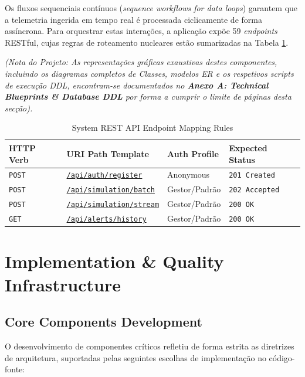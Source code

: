 \documentclass[11pt,a4paper]{article}
\begin{document}
Os fluxos sequenciais contínuos (\textit{sequence workflows for data loops}) garantem que a telemetria ingerida em tempo real é processada ciclicamente de forma assíncrona. Para orquestrar estas interações, a aplicação expõe 59 \textit{endpoints} RESTful, cujas regras de roteamento nucleares estão sumarizadas na Tabela \ref{tab:api_design}. 

\vspace{0.2cm}
\noindent\textit{(Nota do Projeto: As representações gráficas exaustivas destes componentes, incluindo os diagramas completos de Classes, modelos ER e os respetivos scripts de execução DDL, encontram-se documentados no \textbf{Anexo A: Technical Blueprints \& Database DDL} por forma a cumprir o limite de páginas desta secção).}

\begin{table}[H]
\centering
\caption{System REST API Endpoint Mapping Rules}
\label{tab:api_design}
\renewcommand{\arraystretch}{1.2}
\begin{tabular}{llll}
\rowcolor{primaryblue} \textbf{\color{white}HTTP Verb} & \textbf{\color{white}URI Path Template} & \textbf{\color{white}Auth Profile} & \textbf{\color{white}Expected Status} \\
\midrule
\texttt{POST} & \href{http://localhost:8080/api/auth/register}{\texttt{/api/auth/register}} & Anonymous & \texttt{201 Created} \\
\rowcolor{softgray} \texttt{POST} & \href{http://localhost:8080/api/simulation/batch}{\texttt{/api/simulation/batch}} & Gestor/Padrão & \texttt{202 Accepted} \\
\texttt{POST} & \href{http://localhost:8080/api/simulation/stream}{\texttt{/api/simulation/stream}} & Gestor/Padrão & \texttt{200 OK} \\
\rowcolor{softgray} \texttt{GET} & \href{http://localhost:8080/api/alerts/history}{\texttt{/api/alerts/history}} & Gestor/Padrão & \texttt{200 OK} \\
\bottomrule
\end{tabular}
\end{table}

\section{Implementation \& Quality Infrastructure}

\subsection{Core Components Development}
O desenvolvimento de componentes críticos refletiu de forma estrita as diretrizes de arquitetura, suportadas pelas seguintes escolhas de implementação no código-fonte:
\end{document}
